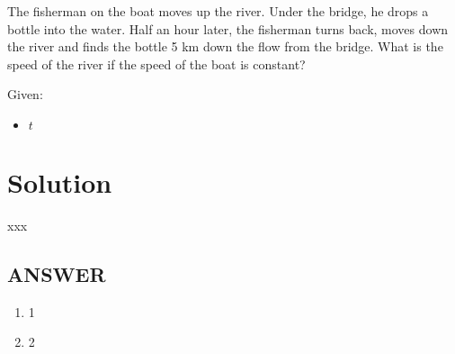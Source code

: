 The fisherman on the boat moves up the river. Under the bridge, he drops a bottle into the water.
Half an hour later, the fisherman turns back, moves down the river and finds the bottle 5 km
down the flow from the bridge. What is the speed of the river if the speed of the boat is constant?

\bigbreak Given: \begin{itemize}
    \item $t$
\end{itemize}

\section*{Solution}

xxx

\vfill
\subsection*{ANSWER}
\begin{enumerate}
    \item 1
    \item 2
\end{enumerate}